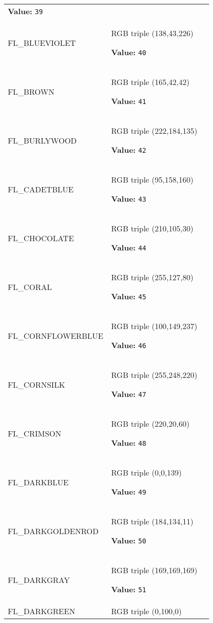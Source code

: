 \begin{longtable}{|p{\varnamewidth}|p{\vardescrwidth}|l}
\textbf{Value:} 
{\tt 39}&\\
\cline{1-2}
\raggedright F\-L\-\_\-B\-L\-U\-E\-V\-I\-O\-L\-E\-T\- & \raggedright RGB triple (138,43,226)

\textbf{Value:} 
{\tt 40}&\\
\cline{1-2}
\raggedright F\-L\-\_\-B\-R\-O\-W\-N\- & \raggedright RGB triple (165,42,42)

\textbf{Value:} 
{\tt 41}&\\
\cline{1-2}
\raggedright F\-L\-\_\-B\-U\-R\-L\-Y\-W\-O\-O\-D\- & \raggedright RGB triple (222,184,135)

\textbf{Value:} 
{\tt 42}&\\
\cline{1-2}
\raggedright F\-L\-\_\-C\-A\-D\-E\-T\-B\-L\-U\-E\- & \raggedright RGB triple (95,158,160)

\textbf{Value:} 
{\tt 43}&\\
\cline{1-2}
\raggedright F\-L\-\_\-C\-H\-O\-C\-O\-L\-A\-T\-E\- & \raggedright RGB triple (210,105,30)

\textbf{Value:} 
{\tt 44}&\\
\cline{1-2}
\raggedright F\-L\-\_\-C\-O\-R\-A\-L\- & \raggedright RGB triple (255,127,80)

\textbf{Value:} 
{\tt 45}&\\
\cline{1-2}
\raggedright F\-L\-\_\-C\-O\-R\-N\-F\-L\-O\-W\-E\-R\-B\-L\-U\-E\- & \raggedright RGB triple (100,149,237)

\textbf{Value:} 
{\tt 46}&\\
\cline{1-2}
\raggedright F\-L\-\_\-C\-O\-R\-N\-S\-I\-L\-K\- & \raggedright RGB triple (255,248,220)

\textbf{Value:} 
{\tt 47}&\\
\cline{1-2}
\raggedright F\-L\-\_\-C\-R\-I\-M\-S\-O\-N\- & \raggedright RGB triple (220,20,60)

\textbf{Value:} 
{\tt 48}&\\
\cline{1-2}
\raggedright F\-L\-\_\-D\-A\-R\-K\-B\-L\-U\-E\- & \raggedright RGB triple (0,0,139)

\textbf{Value:} 
{\tt 49}&\\
\cline{1-2}
\raggedright F\-L\-\_\-D\-A\-R\-K\-G\-O\-L\-D\-E\-N\-R\-O\-D\- & \raggedright RGB triple (184,134,11)

\textbf{Value:} 
{\tt 50}&\\
\cline{1-2}
\raggedright F\-L\-\_\-D\-A\-R\-K\-G\-R\-A\-Y\- & \raggedright RGB triple (169,169,169)

\textbf{Value:} 
{\tt 51}&\\
\cline{1-2}
\raggedright F\-L\-\_\-D\-A\-R\-K\-G\-R\-E\-E\-N\- & \raggedright RGB triple (0,100,0)


\end{longtable}
